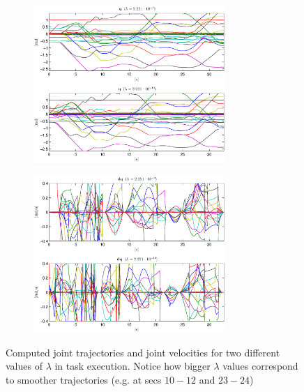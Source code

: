 \begin{figure}
    \vspace{2 mm}
    \centering
    \begin{subfigure}[b]{\textwidth}
        \centering
        \includegraphics[width=0.8\textwidth]{images/valve_lambda_exp/q.eps} %
    \end{subfigure}

    \begin{subfigure}[b]{\textwidth}
        \centering
        \includegraphics[width=0.8\textwidth]{images/valve_lambda_exp/dq.eps} %
    \end{subfigure}
    \caption{Computed joint trajectories and joint velocities for two different values of $\lambda$ in task execution. Notice how bigger $\lambda$ values correspond to smoother trajectories (e.g. at secs $10-12$ and $23-24$) }
    \label{joint_trj_vel}
\end{figure}

